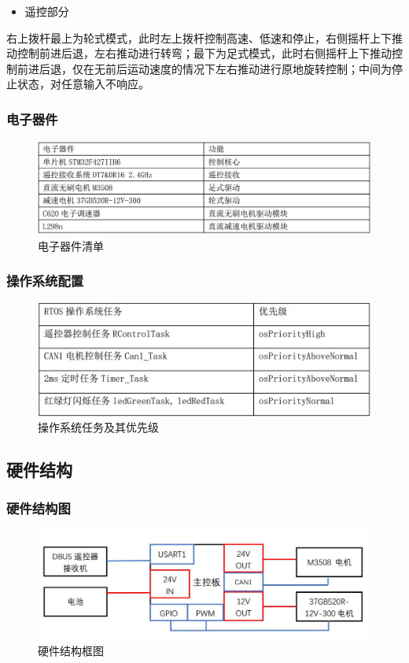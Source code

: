 \documentclass[a4paper, 11pt]{article}   %
\begin{document}
\begin{CJK}{UTF8}{gbsn}
\begin{spacing}{1.15}
\begin{itemize}
\item 遥控部分
\end{itemize}\par
右上拨杆最上为轮式模式，此时左上拨杆控制高速、低速和停止，右侧摇杆上下推动控制前进后退，左右推动进行转弯；最下为足式模式，此时右侧摇杆上下推动控制前进后退，仅在无前后运动速度的情况下左右推动进行原地旋转控制；中间为停止状态，对任意输入不响应。
\subsubsection{电子器件}
 \begin{figure}[H]
\centering
\includegraphics[width=.9\textwidth]{chap5//fig2.jpg}
\caption{电子器件清单}
\end{figure}
\subsubsection{操作系统配置}
 \begin{figure}[H]
\centering
\includegraphics[width=.77\textwidth]{chap5//fig3.jpg}
\caption{操作系统任务及其优先级}
\end{figure}

\subsection{硬件结构}
\subsubsection{硬件结构图}
 \begin{figure}[H]
\centering
\includegraphics[width=.95\textwidth]{chap5//fig4.jpg}
\caption{硬件结构框图}
\end{figure}

\end{spacing}
\end{CJK}
\end{document}
